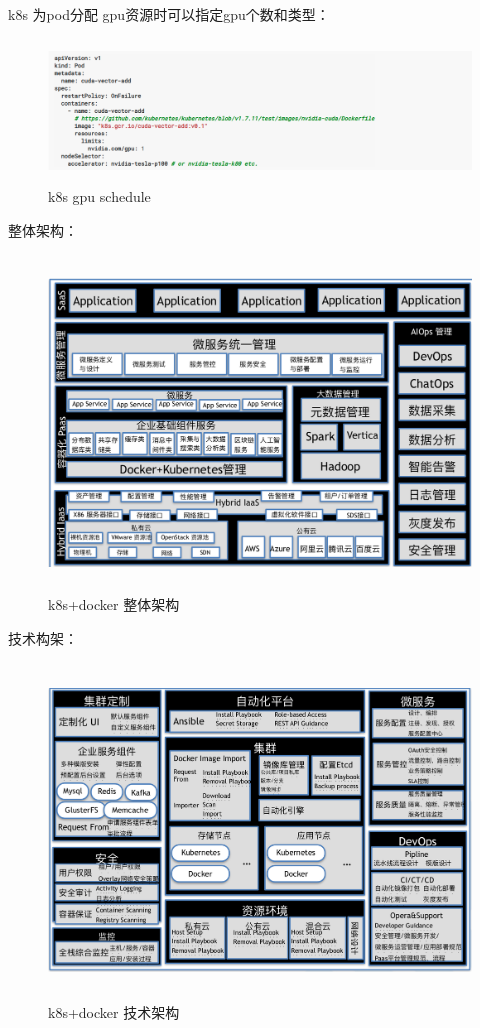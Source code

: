 \documentclass{article}
\begin{document}
\begin{CJK*}{UTF8}{gbsn}
k8s 为pod分配 gpu资源时可以指定gpu个数和类型：
\begin{figure}[H]
\centering
\includegraphics[width=5in,height=1.5in]{gpusc}
\caption{k8s gpu schedule}
\end{figure}
整体架构： 
\begin{figure}[H]
\centering
\includegraphics[width=5in,height=3.5in]{arc1}
\caption{k8s+docker 整体架构}
\end{figure}
技术构架：
\begin{figure}[H]
\centering
\includegraphics[width=5in,height=3.5in]{arc2}
\caption{k8s+docker 技术架构}
\end{figure}

\end{CJK*}
\end{document}
